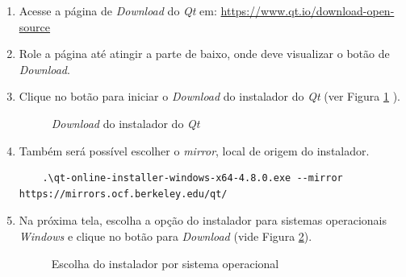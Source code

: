 \documentclass[a4paper,11pt]{article}
\newcommand{\qt}{\textit{Qt}}
\newcommand{\download}{\textit{Download}}
\newcommand{\windows}{\textit{Windows}}
\begin{document}
\begin{enumerate}
	\item Acesse a página de \download{} do \qt{} em: \url{https://www.qt.io/download-open-source}
	\item Role a página até atingir a parte de baixo, onde deve visualizar o botão de \download{}.
	\item Clique no botão para iniciar o \download{} do instalador do \qt{} (ver Figura \ref{fig:qtinstallerdown} ).

\begin{figure}[H]
	\centering
	\caption{\download{} do instalador do \qt{} }
	\label{fig:qtinstallerdown}
\end{figure}

\item Também será possível escolher o \textit{mirror}, local de origem do instalador.

\small
\begin{verbatim}
	.\qt-online-installer-windows-x64-4.8.0.exe --mirror https://mirrors.ocf.berkeley.edu/qt/
\end{verbatim}
\normalsize

	\item Na próxima tela, escolha a opção do instalador para sistemas operacionais \windows{} e clique no botão para \download{} (vide Figura \ref{fig:qtinstallerwin}).
	
\begin{figure}[H]
	\centering
	\caption{Escolha do instalador por sistema operacional}
	\label{fig:qtinstallerwin}
\end{figure}


\end{enumerate}
\end{document}
